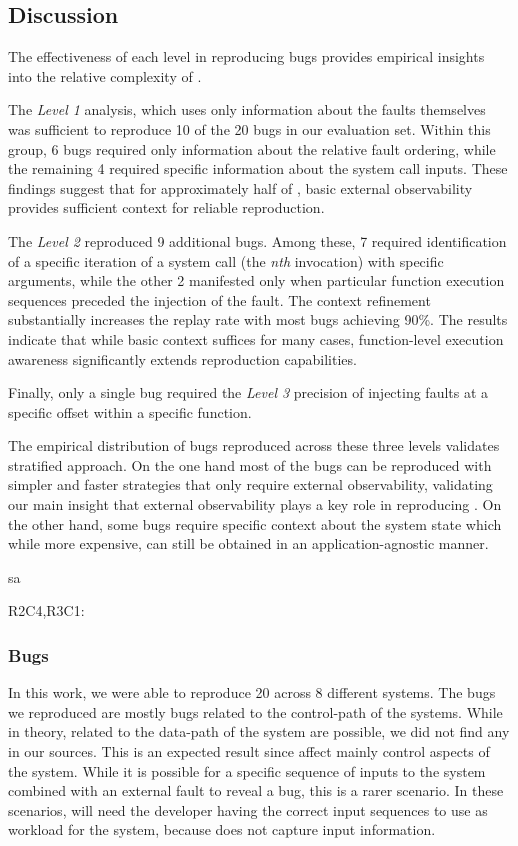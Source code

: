 \subsection{Discussion}
The effectiveness of each level in reproducing bugs provides empirical insights into the relative complexity of \efib.

The \emph{Level 1} analysis, which uses only information about the faults themselves was sufficient to reproduce 10 of the 20 bugs in our evaluation set.
Within this group, 6 bugs required only information about the relative fault ordering, while the remaining 4 required specific information about the system call inputs.
These findings suggest that for approximately half of \efib, basic external observability provides sufficient context for reliable reproduction.

The \emph{Level 2} reproduced 9 additional bugs.
Among these, 7 required identification of a specific iteration of a system call (the \emph{nth} invocation) with specific arguments, while the other 2 manifested only when particular function execution sequences preceded the injection of the fault.
The context refinement substantially increases the replay rate with most bugs achieving 90\%.
The results indicate that while basic context suffices for many cases, function-level execution awareness significantly extends reproduction capabilities.

Finally, only a single bug required the \emph{Level 3} precision of injecting faults at a specific offset within a specific function.

The empirical distribution of bugs reproduced across these three levels validates \sys stratified approach.
On the one hand most of the bugs can be reproduced with simpler and faster strategies that only require external observability, validating our main insight that external observability plays a key role in reproducing \efib.
On the other hand, some bugs require specific context about the system state which while more expensive, can still be obtained in an application-agnostic manner.

sa{R2C4,R3C1: \subsubsection{Bugs} In this work, we were able to reproduce 20 \efibshort across 8 different systems. The bugs we reproduced are mostly bugs related to the control-path of the systems.
		While in theory, \efibshort related to the data-path of the system are possible, we did not find any in our sources.
		This is an expected result since \efibshort affect mainly control aspects of the system.
		While it is possible for a specific sequence of inputs to the system combined with an external fault to reveal a bug, this is a rarer scenario. In these scenarios, \sys will need the developer having the correct input sequences to use as workload for the system, because \sys does not capture input information.}

